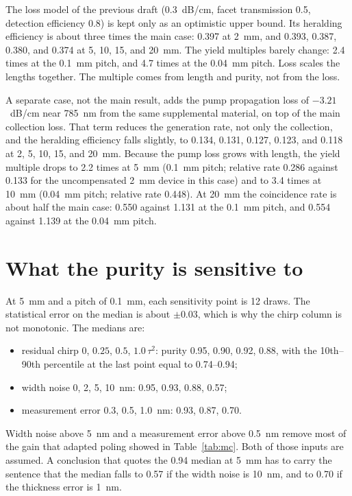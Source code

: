 \documentclass[11pt,a4paper]{article}
\begin{document}
The loss model of the previous draft (0.3~dB/cm, facet transmission 0.5, detection efficiency 0.8) is kept only as an optimistic upper bound.
Its heralding efficiency is about three times the main case: 0.397 at 2~mm, and 0.393, 0.387, 0.380, and 0.374 at 5, 10, 15, and 20~mm.
The yield multiples barely change: 2.4 times at the 0.1~mm pitch, and 4.7 times at the 0.04~mm pitch.
Loss scales the lengths together.
The multiple comes from length and purity, not from the loss.

A separate case, not the main result, adds the pump propagation loss of $-3.21$~dB/cm near 785~nm from the same supplemental material, on top of the main collection loss.
That term reduces the generation rate, not only the collection, and the heralding efficiency falls slightly, to 0.134, 0.131, 0.127, 0.123, and 0.118 at 2, 5, 10, 15, and 20~mm.
Because the pump loss grows with length, the yield multiple drops to 2.2 times at 5~mm (0.1~mm pitch; relative rate 0.286 against 0.133 for the uncompensated 2~mm device in this case) and to 3.4 times at 10~mm (0.04~mm pitch; relative rate 0.448).
At 20~mm the coincidence rate is about half the main case: 0.550 against 1.131 at the 0.1~mm pitch, and 0.554 against 1.139 at the 0.04~mm pitch.

\section{What the purity is sensitive to}
\label{sec:sens}
At 5~mm and a pitch of 0.1~mm, each sensitivity point is 12 draws.
The statistical error on the median is about $\pm 0.03$, which is why the chirp column is not monotonic.
The medians are:
\begin{itemize}
\item residual chirp $0$, $0.25$, $0.5$, $1.0\,\tau^{2}$: purity 0.95, 0.90, 0.92, 0.88, with the 10th--90th percentile at the last point equal to 0.74--0.94;
\item width noise 0, 2, 5, 10~nm: 0.95, 0.93, 0.88, 0.57;
\item measurement error 0.3, 0.5, 1.0~nm: 0.93, 0.87, 0.70.
\end{itemize}
Width noise above 5~nm and a measurement error above 0.5~nm remove most of the gain that adapted poling showed in Table~\ref{tab:mc}.
Both of those inputs are assumed.
A conclusion that quotes the 0.94 median at 5~mm has to carry the sentence that the median falls to 0.57 if the width noise is 10~nm, and to 0.70 if the thickness error is 1~nm.
\end{document}
